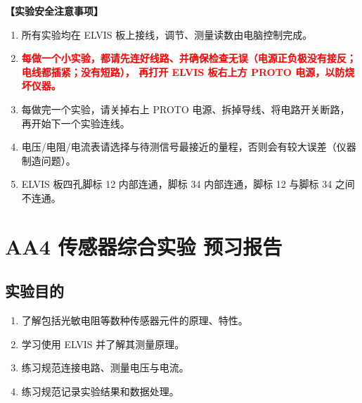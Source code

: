 \documentclass[dvipsnames, svgnames,a4paper,11pt]{article}
\begin{document}
	\textbf{【实验安全注意事项】}	
	\begin{enumerate}
		\item 所有实验均在 ELVIS 板上接线，调节、测量读数由电脑控制完成。
		\item \textcolor{red}{\textbf{每做一个小实验，都请先连好线路、并确保检查无误（电源正负极没有接反；电线都插紧；没有短路），
		再打开 ELVIS 板右上方 PROTO 电源，以防烧坏仪器。}}
		\item 每做完一个实验，请关掉右上 PROTO 电源、拆掉导线、将电路开关断路，再开始下一个实验连线。
		\item 电压/电阻/电流表请选择与待测信号最接近的量程，否则会有较大误差（仪器制造问题）。
		\item ELVIS 板四孔脚标 12 内部连通，脚标 34 内部连通，脚标 12 与脚标 34 之间不连通。
		
	\end{enumerate}
	
	
	
	
	
	\clearpage
	\tableofcontents
	\clearpage
	
	
	
	\setcounter{section}{0}
	\section{AA4 传感器综合实验 \quad\heiti 预习报告}
	
	\subsection{实验目的}
	\begin{enumerate}
		\item 了解包括光敏电阻等数种传感器元件的原理、特性。
		
		\item 学习使用 ELVIS 并了解其测量原理。
		
		\item 练习规范连接电路、测量电压与电流。
		
		\item 练习规范记录实验结果和数据处理。
	\end{enumerate}
	
\end{document}
